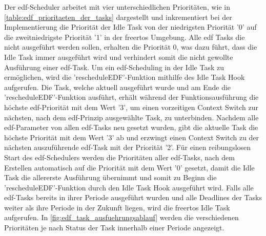 \documentclass[../EDF Master Thesis.tex]{subfiles}
\begin{document}
    Der \ac{edf}-Scheduler arbeitet mit vier unterschiedlichen Prioritäten, wie in \autoref{table:edf_prioritaeten_der_tasks} dargestellt und inkrementiert bei der Implementierung die Priorität der Idle Task von der niedrigsten Priorität '0' auf die zweitniedrigste Priorität '1' in der \ac{freertos} Umgebung.
    Alle \ac{edf} Tasks die nicht ausgeführt werden sollen, erhalten die Priorität 0, was dazu führt, dass die Idle Task immer ausgeführt wird und verhindert somit die nicht gewollte Ausführung einer \ac{edf}-Task.
    Um ein \ac{edf}-Scheduling in der Idle Task zu ermöglichen, wird die 'rescheduleEDF'-Funktion mithilfe des Idle Task Hook aufgerufen.
    Die Task, welche aktuell ausgeführt wurde und am Ende die 'rescheduleEDF'-Funktion ausführt, erhält während der Funktionsausführung die höchste \ac{edf}-Priorität mit dem Wert '3', um einen vorzeitigen Context Switch zur nächsten, nach dem \ac{edf}-Prinzip ausgewählte Task, zu unterbinden.
    Nachdem alle \ac{edf}-Parameter von allen \ac{edf}-Tasks neu gesetzt wurden, gibt die aktuelle Task die höchste Priorität mit dem Wert '3' ab und erzwingt einen Context Switch zu der nächsten auszuführende \ac{edf}-Task mit der Priorität '2'.
    Für einen reibungslosen Start des \ac{edf}-Schedulers werden die Prioritäten aller \ac{edf}-Tasks, nach dem Erstellen automatisch auf die Priorität mit dem Wert '0' gesetzt, damit die Idle Task die allererste Ausführung übernimmt und somit zu Beginn die 'rescheduleEDF'-Funktion durch den Idle Task Hook ausgeführt wird.
    Falls alle \ac{edf}-Tasks bereits in ihrer Periode ausgeführt wurden und alle Deadlines der Tasks weiter als ihre Periode in der Zukunft liegen, wird die \ac{freertos} Idle Task aufgerufen.
    In \autoref{fig:edf_task_ausfuehrungsablauf} werden die verschiedenen Prioritäten je nach Status der Task innerhalb einer Periode angezeigt.
    
\end{document}
